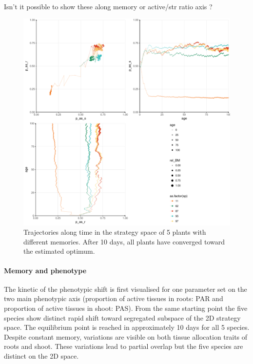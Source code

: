 Isn't it possible to show these along memory or active/str ratio axis ?


\begin{figure}\label{fig:plastic_allocation_trajectory}
\includegraphics[width = \textwidth]{./2_PP/Figures/Individual/memory_effect.pdf}
\caption{Trajectories along time in the strategy space of 5 plants with different memories. After 10 days, all plants have converged toward the estimated optimum.}
\end{figure}

\paragraph{Memory and phenotype}

The kinetic of the phenotypic shift is first visualised for one parameter set on the two main phenotypic axis (proportion of active tissues in roots: PAR and proportion of active tissues in shoot: PAS). From the same starting point the five species show distinct rapid shift toward segregated subspace of the 2D strategy space. The equilibrium point is reached in approximately 10 days for all 5 species. Despite constant memory, variations are visible on both tissue allocation traits of roots and shoot. These variations lead to partial overlap but the five species are distinct on the 2D space.

